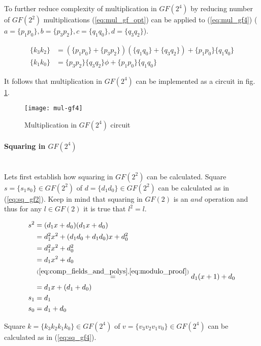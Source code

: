 To further reduce complexity of multiplication in $GF(2^4)$ by reducing number of $GF(2^2)$ multiplications (\ref{eq:mul_gf_opt}) can be applied to (\ref{eq:mul_gf4}) ($a = \{p_1p_0\}, b = \{p_3p_2\}, c = \{q_1q_0\}, d = \{q_3q_2\}$).

\begin{equation}
\label{eq:mul_gf4_final}
\begin{aligned}
\{k_3k_2\} &= (\{p_1p_0\} + \{p_3p_2\})(\{q_1q_0\} + \{q_3q_2\}) + \{p_1p_0\}\{q_1q_0\}\\
\{k_1k_0\} &= \{p_3p_2\}\{q_3q_2\}\phi + \{p_1p_0\}\{q_1q_0\}
\end{aligned}
\end{equation}

It follows that multiplication in $GF(2^4)$ can be implemented as a circuit in fig. \ref{fig:mul_gf4}.

\begin{figure}[!h]
\centering
\texttt{[image: mul-gf4]}
\caption{Multiplication in $GF(2^4)$ circuit}
\label{fig:mul_gf4}
\end{figure}

\paragraph{Squaring in $GF(2^4)$}\mbox{}\\
Lets first establish how squaring in $GF(2^2)$ can be calculated. 
Square $s = \{s_1s_0\} \in GF(2^2)$ of $d = \{d_1d_0\} \in GF(2^2)$ can be calculated as in (\ref{eq:sq_gf2}). Keep in mind that squaring in $GF(2)$ is an $and$ operation and thus for any $l \in GF(2)$ it is true that $l^2 = l$.

\begin{equation}
\label{eq:sq_gf2}
\begin{aligned}
s^2 &= (d_1x + d_0)(d_1x + d_0) \\
&= d_1^2x^2 + (d_1d_0 + d_1d_0)x + d_0^2 \\
&= d_1^2x^2 + d_0^2 \\
&= d_1x^2 + d_0\\
&\stackrel{(\ref{eq:comp_fields_and_polys}, \ref{eq:modulo_proof})}{=}
d_1(x + 1) + d_0 \\
&= d_1x + (d_1 + d_0)\\
s_1 &= d_1\\
s_0 &= d_1 + d_0
\end{aligned}
\end{equation}

Square $k = \{k_3k_2k_1k_0\} \in GF(2^4)$ of $v = \{v_3v_2v_1v_0\} \in GF(2^4)$ can be calculated as in (\ref{eq:sq_gf4}).

